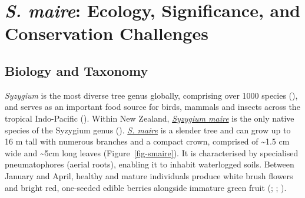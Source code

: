\documentclass[
]{scrreprt}
\begin{document}
\section{\texorpdfstring{\emph{S. maire}: Ecology, Significance, and
Conservation
Challenges}{S. maire: Ecology, Significance, and Conservation Challenges}}\label{s.-maire-ecology-significance-and-conservation-challenges}

\subsection{Biology and Taxonomy}\label{biology-and-taxonomy}

\emph{Syzygium} is the most diverse tree genus globally, comprising over
1000 species (),
and serves as an important food source for birds, mammals and insects
across the tropical Indo-Pacific
().
Within New Zealand, \hyperref[acronyms_SM]{\emph{Syzygium maire}} is the
only native species of the Syzygium genus
().
\hyperref[acronyms_SM]{\emph{S. maire}} is a slender tree and can grow
up to 16 m tall with numerous branches and a compact crown, comprised of
\textasciitilde1.5 cm wide and \textasciitilde5cm long leaves
(Figure~\ref{fig-smaire}). It is characterised by specialised
pneumatophores (aerial roots), enabling it to inhabit waterlogged soils.
Between January and April, healthy and mature individuals produce white
brush flowers and bright red, one-seeded edible berries alongside
immature green fruit (; ;
).
\end{document}

